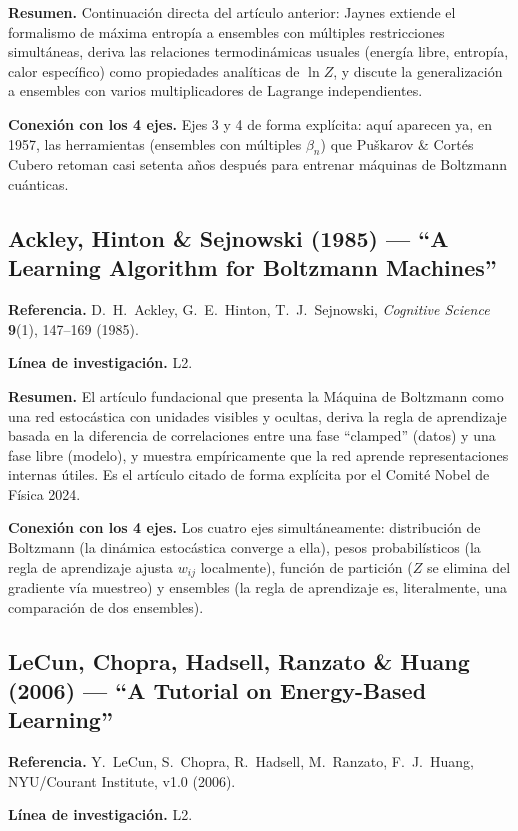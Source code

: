 \documentclass[12pt]{article}
\begin{document}
\textbf{Resumen.} Continuación directa del artículo anterior: Jaynes extiende el formalismo de máxima entropía a ensembles con múltiples restricciones simultáneas, deriva las relaciones termodinámicas usuales (energía libre, entropía, calor específico) como propiedades analíticas de $\ln Z$, y discute la generalización a ensembles con varios multiplicadores de Lagrange independientes.

\textbf{Conexión con los 4 ejes.} Ejes 3 y 4 de forma explícita: aquí aparecen ya, en 1957, las herramientas (ensembles con múltiples $\beta_n$) que Puškarov \& Cortés Cubero retoman casi setenta años después para entrenar máquinas de Boltzmann cuánticas.

\subsection{Ackley, Hinton \& Sejnowski (1985) --- ``A Learning Algorithm for Boltzmann Machines''}
\textbf{Referencia.} D.~H.~Ackley, G.~E.~Hinton, T.~J.~Sejnowski, \textit{Cognitive Science} \textbf{9}(1), 147--169 (1985). \cite{ackley1985estado}

\textbf{Línea de investigación.} L2.

\textbf{Resumen.} El artículo fundacional que presenta la Máquina de Boltzmann como una red estocástica con unidades visibles y ocultas, deriva la regla de aprendizaje basada en la diferencia de correlaciones entre una fase ``clamped'' (datos) y una fase libre (modelo), y muestra empíricamente que la red aprende representaciones internas útiles. Es el artículo citado de forma explícita por el Comité Nobel de Física 2024.

\textbf{Conexión con los 4 ejes.} Los cuatro ejes simultáneamente: distribución de Boltzmann (la dinámica estocástica converge a ella), pesos probabilísticos (la regla de aprendizaje ajusta $w_{ij}$ localmente), función de partición ($Z$ se elimina del gradiente vía muestreo) y ensembles (la regla de aprendizaje es, literalmente, una comparación de dos ensembles).

\subsection{LeCun, Chopra, Hadsell, Ranzato \& Huang (2006) --- ``A Tutorial on Energy-Based Learning''}
\textbf{Referencia.} Y.~LeCun, S.~Chopra, R.~Hadsell, M.~Ranzato, F.~J.~Huang, NYU/Courant Institute, v1.0 (2006). \cite{lecun2006estado}

\textbf{Línea de investigación.} L2.
\end{document}
